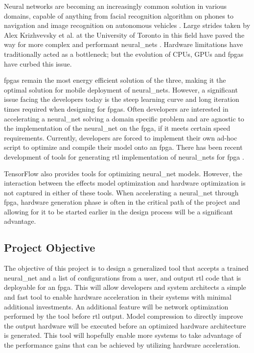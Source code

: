 \documentclass{uw-ece-wkrpt}
\begin{document}
Neural networks are becoming an increasingly common solution in various domains, capable of anything from facial recognition algorithm on phones \cite{Stoimenov2016Face-recognitio} to navigation and image recognition on autonomous vehicles \cite{Ucar2017Object-recognit}. Large strides taken by Alex Krizhvevsky et al. at the University of Toronto in this field have paved the way for more complex and performant \glspl{neural_net} \cite{Krizhevsky2017ImageNet-Classi}. Hardware limitations have traditionally acted as a bottleneck; but the evolution of CPUs, GPUs and \glspl{fpga} have curbed this issue.

\glspl{fpga} remain the most energy efficient solution of the three, making it the optimal solution for mobile deployment of \glspl{neural_net}. However, a significant issue facing the developers today is the steep learning curve and long iteration times required when designing for \glspl{fpga}. Often developers are interested in accelerating a \gls{neural_net} solving a domain specific problem and are agnostic to the implementation of the \gls{neural_net} on the \gls{fpga}, if it meets certain speed requirements. Currently, developers are forced to implement their own ad-hoc script to optimize and compile their model onto an \gls{fpga}. There has been recent development of tools for generating \gls{rtl} implementation of \glspl{neural_net} for \gls{fpga} \cite{Ma2017An-automatic-RT}.

TensorFlow also provides tools for optimizing \gls{neural_net} models. However, the interaction between the effects model optimization and hardware optimization is not captured in either of these tools. When accelerating a \gls{neural_net} through \gls{fpga}, hardware generation phase is often in the critical path of the project and allowing for it to be started earlier in the design process will be a significant advantage.

\subsection{Project Objective}

The objective of this project is to design a generalized tool that accepts a trained \gls{neural_net} and a list of configurations from a user, and output \gls{rtl} code that is deployable for an \gls{fpga}. This will allow developers and system architects a simple and fast tool to enable hardware acceleration in their systems with minimal additional investments. An additional feature will be network optimization performed by the tool before \gls{rtl} output. Model compression to directly improve the output hardware will be executed before an optimized hardware architecture is generated. This tool will hopefully enable more systems to take advantage of the performance gains that can be achieved by utilizing hardware acceleration.
\end{document}
